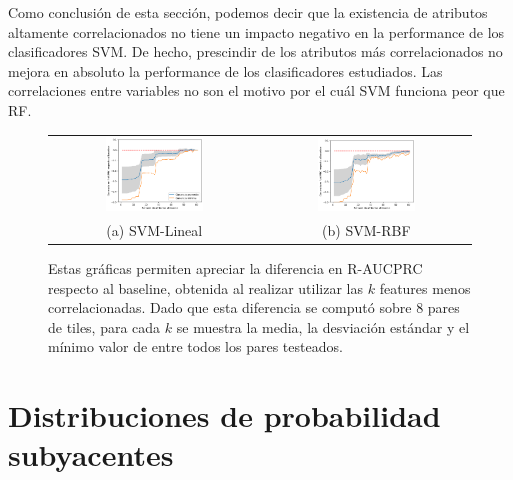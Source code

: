 Como conclusión de esta sección, podemos decir que la existencia de atributos altamente correlacionados no tiene un impacto negativo en la performance de los clasificadores SVM. De hecho, prescindir de los atributos más correlacionados no mejora en absoluto la performance de los clasificadores estudiados. Las correlaciones entre variables no son el motivo por el cuál SVM funciona peor que RF.

\begin{figure}[h!]
\begin{tabular}{cc}
  \includegraphics[width=0.49\textwidth]{Kap6/pearson_linear_CORRELATIONS_BIG_PICTURE.png} &   \includegraphics[width=0.49\textwidth]{Kap6/pearson_rbf_CORRELATIONS_BIG_PICTURE.png} \\
(a) SVM-Lineal & (b) SVM-RBF
\end{tabular}
\caption{Estas gráficas permiten apreciar la diferencia en R-AUCPRC respecto al baseline, obtenida al realizar utilizar las $k$ features menos correlacionadas. Dado que esta diferencia se computó sobre 8 pares de tiles, para cada $k$ se muestra la media, la desviación estándar y el mínimo valor de entre todos los pares testeados. }
\label{fig:svm_correlation_summary}
\end{figure}

\section{Distribuciones de probabilidad subyacentes}

